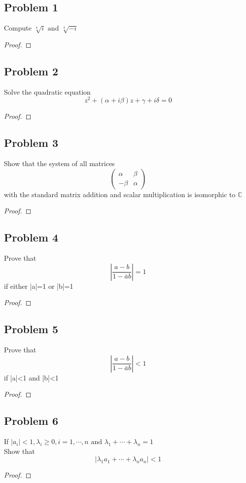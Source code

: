 \documentclass[letterpaper, 11pt]{article}
\newcommand{\1}{\mathds{1}}	%
\theoremstyle{definition}
\begin{document}
\subsection*{Problem 1}
Compute $ \sqrt[4]{i} \text{ and } \sqrt[4]{-i} $ 
\begin{proof}
    
\end{proof}
\subsection*{Problem 2}
Solve the quadratic equation $$
    z^2+(\alpha+i\beta)z+\gamma+i\delta=0
$$ 
\begin{proof}
    
\end{proof}
\subsection*{Problem 3}
Show that the system of all matrices$$
    \begin{pmatrix}
        \alpha & \beta \\
        -\beta & \alpha
    \end{pmatrix}
$$ with the standard matrix addition and scalar multiplication is isomorphic to $ \mathbb{C} $ 
\begin{proof}
    
\end{proof}
\subsection*{Problem 4}
Prove that $$
    |\frac{a-b}{1-\bar{a}b}|=1
$$ if either |a|=1 or |b|=1
\begin{proof}
    
\end{proof}
\subsection*{Problem 5}
Prove that $$
    |\frac{a-b}{1-\bar{a}b}|<1
$$ if |a|<1 and |b|<1
\begin{proof}
    
\end{proof}
\subsection*{Problem 6}
If $ |a_i|<1,\lambda_i\geq0,i=1,\cdots,n\text{ and }\lambda_1+\cdots+\lambda_n=1 $\\
Show that$$
    |\lambda_1a_1+\cdots+\lambda_na_n|<1
$$  
\begin{proof}
    
\end{proof}
\end{document}
